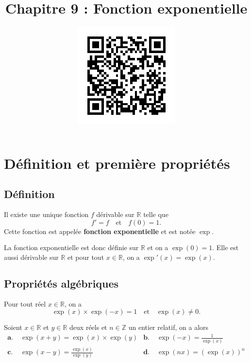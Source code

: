 \documentclass[11pt]{article}
\title{\vspace{-15mm}Chapitre 9 : Fonction exponentielle}
\date{\vspace{-14mm}
\href{https://erou.forge.aeif.fr/spe-1e/expo.html}{
  \includegraphics[scale=.6]{qrcode.png}}
\vspace{-14mm}}
\author{}
\begin{document}
\maketitle\thispagestyle{fancy}

\section{Définition et première propriétés}
\subsection{Définition}
\begin{thmadm}
  Il existe une unique fonction $f$ dérivable sur $\mathbb{R}$ telle que
  \[
    f' = f\quad\text{et}\quad f(0)=1.
  \]
  Cette fonction est appelée \textbf{fonction exponentielle} et est notée
  $\exp$.
\end{thmadm}
\begin{rmq}
  La fonction exponentielle est donc définie sur $\mathbb{R}$ et on a
  $\exp(0)=1$. Elle est aussi dérivable sur $\mathbb{R}$ et pour tout
  $x\in\mathbb{R}$, on a $\exp'(x)=\exp(x)$.
\end{rmq}

\subsection{Propriétés algébriques}
\begin{prop}
  Pour tout réel $x\in\mathbb{R}$, on a
  \[
    \exp(x)\times\exp(-x)=1\quad\text{et}\quad\exp(x)\neq0.
  \]
\end{prop}
\begin{prop}
  Soient $x\in\mathbb{R}$ et $y\in\mathbb{R}$ deux réels et $n\in\mathbb{Z}$ un
  entier relatif, on a alors
  \begin{align*}
    \textbf{a.}\;& \exp(x+y) = \exp(x)\times\exp(y) &
    \textbf{b.}\;& \exp(-x) = \frac{1}{\exp(x)} \\
    \textbf{c.}\;& \exp(x-y) = \frac{\exp(x)}{\exp(y)} &
    \textbf{d.}\;& \exp(nx) = (\exp(x))^n
  \end{align*}
\end{prop}
\end{document}
